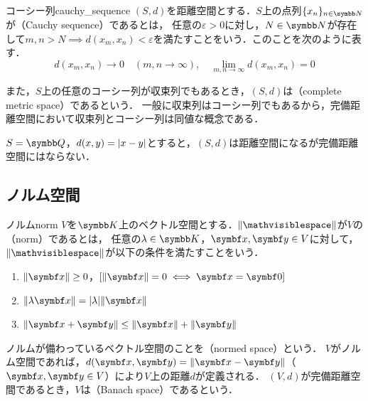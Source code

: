 \documentclass[../../main]{subfiles}
\begin{document}
\begin{definition}{コーシー列}{cauchy_sequence}
  \((S,d)\)を距離空間とする．\(S\)上の点列\(\seq{x_n}_{n\in\numset{N}}\)が（Cauchy sequence）であるとは，
  任意の\(\varepsilon>0\)に対し，\(N\in\numset{N}\)が存在して\(m,n>N\implies d(x_m,x_n)<\varepsilon\)を満たすことをいう．このことを次のように表す．
  \[
    d(x_m,x_n) \to 0\quad(m,n\to\infty),
    \quad\lim_{m,n\to\infty}d(x_m,x_n) = 0
  \]
\end{definition}

また，\(S\)上の任意のコーシー列が収束列でもあるとき，\((S,d)\)は（complete metric space）であるという．
一般に収束列はコーシー列でもあるから，完備距離空間において収束列とコーシー列は同値な概念である．

\begin{example}
  \(S=\numset{Q}\)，\(d(x,y)=\lvert x-y\rvert\)とすると，\((S,d)\)は距離空間になるが完備距離空間にはならない．
\end{example}

\subsection{ノルム空間}

\begin{definition}{ノルム}{norm}\indexsymbol{\(\vnorm{\holder}\)}
  \(V\)を\(\numset{K}\)上のベクトル空間とする．\(\vnorm{\holder}\)が\(V\)の（norm）であるとは，
  任意の\(\lambda\in\numset{K}\)，\(\vect{x},\vect{y}\in V\)に対して，\(\vnorm{\holder}\)が以下の条件を満たすことをいう．
  \begin{enumerate}
    \item \(\vnorm{\vect{x}}\geq 0\)，\([\vnorm{\vect{x}}=0\iff\vect{x}=\zvec]\)
    \item \(\vnorm{\lambda\vect{x}}=\abs{\lambda}\vnorm{\vect{x}}\)
    \item \(\vnorm{\vect{x}+\vect{y}}\leq\vnorm{\vect{x}}+\vnorm{\vect{y}}\)
  \end{enumerate}
\end{definition}

ノルムが備わっているベクトル空間のことを（normed space）という．
\(V\)がノルム空間であれば，\(d(\vect{x},\vect{y})=\vnorm{\vect{x}-\vect{y}}\)（\(\vect{x},\vect{y}\in V\)）により\(V\)上の距離\(d\)が定義される．
\((V,d)\)が完備距離空間であるとき，\(V\)は（Banach space）であるという．
\end{document}
